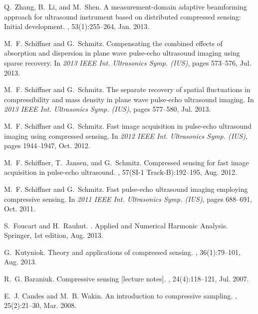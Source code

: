 \documentclass[10pt,twocolumn,romanappendices,final]{IEEEtran}
\begin{document}
\begin{thebibliography}{100}
Q.~Zhang, B.~Li, and M.~Shen.
\newblock A measurement-domain adaptive beamforming approach for ultrasound
  instrument based on distributed compressed sensing: {I}nitial development.
, 53(1):255--264, Jan. 2013.

M.~F. Schiffner and G.~Schmitz.
\newblock Compensating the combined effects of absorption and dispersion in
  plane wave pulse-echo ultrasound imaging using sparse recovery.
\newblock In {\em 2013 IEEE Int. Ultrasonics Symp. (IUS)}, pages 573--576, Jul.
  2013.

M.~F. Schiffner and G.~Schmitz.
\newblock The separate recovery of spatial fluctuations in compressibility and
  mass density in plane wave pulse-echo ultrasound imaging.
\newblock In {\em 2013 IEEE Int. Ultrasonics Symp. (IUS)}, pages 577--580, Jul.
  2013.

M.~F. Schiffner and G.~Schmitz.
\newblock Fast image acquisition in pulse-echo ultrasound imaging using
  compressed sensing.
\newblock In {\em 2012 IEEE Int. Ultrasonics Symp. (IUS)}, pages 1944--1947,
  Oct. 2012.

M.~F. Schiffner, T.~Jansen, and G.~Schmitz.
\newblock Compressed sensing for fast image acquisition in pulse-echo
  ultrasound.
, 57(SI-1 Track-B):192--195, Aug. 2012.

M.~F. Schiffner and G.~Schmitz.
\newblock Fast pulse-echo ultrasound imaging employing compressive sensing.
\newblock In {\em 2011 IEEE Int. Ultrasonics Symp. (IUS)}, pages 688--691, Oct.
  2011.

S.~Foucart and H.~Rauhut.
.
\newblock Applied and Numerical Harmonic Analysis. Springer, 1st edition, Aug.
  2013.

G.~Kutyniok.
\newblock Theory and applications of compressed sensing.
, 36(1):79--101, Aug. 2013.

R.~G. Baraniuk.
\newblock Compressive sensing [lecture notes].
, 24(4):118--121, Jul. 2007.

E.~J. Candes and M.~B. Wakin.
\newblock An introduction to compressive sampling.
, 25(2):21--30, Mar. 2008.


\end{thebibliography}
\end{document}

